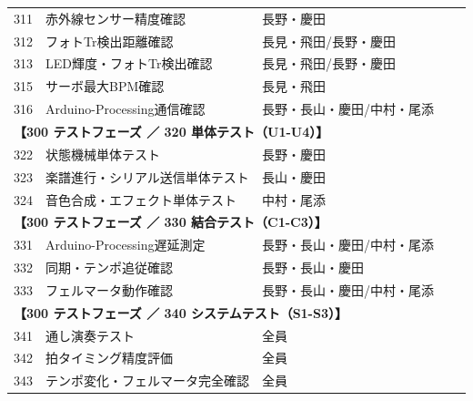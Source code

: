 \begin{longtable}{p{0.9cm}p{7cm}p{2.5cm}p{2cm}p{2cm}}
\midrule
311 & 赤外線センサー精度確認 & 長野・慶田 &  &  \\
312 & フォトTr検出距離確認 & 長見・飛田/長野・慶田 &  &  \\
313 & LED輝度・フォトTr検出確認 & 長見・飛田/長野・慶田 &  &  \\
315 & サーボ最大BPM確認 & 長見・飛田 &  &  \\
316 & Arduino-Processing通信確認 & 長野・長山・慶田/中村・尾添 &  &  \\
\midrule
\multicolumn{5}{l}{\textbf{【300 テストフェーズ ／ 320 単体テスト（U1-U4）】}} \\
\midrule
322 & 状態機械単体テスト & 長野・慶田 &  &  \\
323 & 楽譜進行・シリアル送信単体テスト & 長山・慶田 &  &  \\
324 & 音色合成・エフェクト単体テスト & 中村・尾添 &  &  \\
\midrule
\multicolumn{5}{l}{\textbf{【300 テストフェーズ ／ 330 結合テスト（C1-C3）】}} \\
\midrule
331 & Arduino-Processing遅延測定 & 長野・長山・慶田/中村・尾添 &  &  \\
332 & 同期・テンポ追従確認 & 長野・長山・慶田 &  &  \\
333 & フェルマータ動作確認 & 長野・長山・慶田/中村・尾添 &  &  \\
\midrule
\multicolumn{5}{l}{\textbf{【300 テストフェーズ ／ 340 システムテスト（S1-S3）】}} \\
\midrule
341 & 通し演奏テスト & 全員 &  &  \\
342 & 拍タイミング精度評価 & 全員 &  &  \\
343 & テンポ変化・フェルマータ完全確認 & 全員 &  &  \\
\midrule

\end{longtable}
\endgroup
